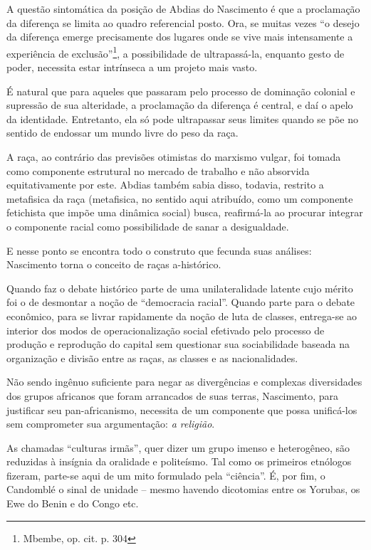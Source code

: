 A questão sintomática da posição de Abdias do Nascimento é que a
proclamação da diferença se limita ao quadro referencial posto. Ora, se
muitas vezes ``o desejo da diferença emerge precisamente dos lugares
onde se vive mais intensamente a experiência de exclusão''\footnote{Mbembe,
  op. cit. p. 304}, a possibilidade de ultrapassá-la, enquanto gesto de
poder, necessita estar intrínseca a um projeto mais vasto.

É natural que para aqueles que passaram pelo processo de dominação
colonial e supressão de sua alteridade, a proclamação da diferença é
central, e daí o apelo da identidade. Entretanto, ela só pode
ultrapassar seus limites quando se põe no sentido de endossar um mundo
livre do peso da raça.

A raça, ao contrário das previsões otimistas do marxismo vulgar, foi
tomada como componente estrutural no mercado de trabalho e não absorvida
equitativamente por este. Abdias também sabia disso, todavia, restrito a
metafisica da raça (metafisica, no sentido aqui atribuído, como um
componente fetichista que impõe uma dinâmica social) busca, reafirmá-la
ao procurar integrar o componente racial como possibilidade de sanar a
desigualdade.

E nesse ponto se encontra todo o construto que fecunda suas análises:
Nascimento torna o conceito de raças a-histórico.

Quando faz o debate histórico parte de uma unilateralidade latente cujo
mérito foi o de desmontar a noção de ``democracia racial''. Quando parte
para o debate econômico, para se livrar rapidamente da noção de luta de
classes, entrega-se ao interior dos modos de operacionalização social
efetivado pelo processo de produção e reprodução do capital sem
questionar sua sociabilidade baseada na organização e divisão entre as
raças, as classes e as nacionalidades.

Não sendo ingênuo suficiente para negar as divergências e complexas
diversidades dos grupos africanos que foram arrancados de suas terras,
Nascimento, para justificar seu pan-africanismo, necessita de um
componente que possa unificá-los sem comprometer sua argumentação:
\emph{a religião}.

As chamadas ``culturas irmãs'', quer dizer um grupo imenso e
heterogêneo, são reduzidas à insígnia da oralidade e politeísmo. Tal
como os primeiros etnólogos fizeram, parte-se aqui de um mito formulado
pela ``ciência''. É, por fim, o Candomblé o sinal de unidade -- mesmo
havendo dicotomias entre os Yorubas, os Ewe do Benin e do Congo etc.

